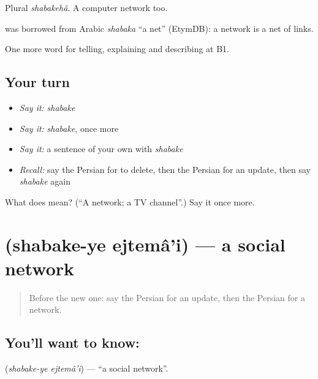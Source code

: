 Plural \emph{shabakehâ}. A computer network too.

\begin{cousinweb}
\textbf{} was borrowed from Arabic \emph{shabaka} \textquotedblleft{}a net\textquotedblright{} (EtymDB): a network is a net of links.
\end{cousinweb}

\begin{grammarlens}[title={What you've built}]
One more word for telling, explaining and describing at B1.
\end{grammarlens}

\subsection*{Your turn}
\begin{itemize}
\raggedright
  \item \emph{Say it:} \emph{shabake}
  \item \emph{Say it:} \emph{shabake}, once more
  \item \emph{Say it:} a sentence of your own with \emph{shabake}
  \item \emph{Recall:} say the Persian for to delete, then the Persian for an update, then say \emph{shabake} again
\end{itemize}

\begin{tcolorbox}[breakable,colback=teal!4,colframe=teal!35!black,title={Before you move on}]
What does  mean? (\textquotedblleft{}A network; a TV channel\textquotedblright{}.) Say it once more.
\end{tcolorbox}
\section[\texorpdfstring{\fa{شبکه} \fa{اجتماعی} (shabake-ye ejtemâ'i)}{شبکه اجتماعی (shabake-ye ejtemâ'i)}]{  (shabake-ye ejtemâ'i) — a social network}

\label{lesson:FA-C417-shabake-ye-ejtemai}



\begin{quote}
Before the new one: say the Persian for an update, then the Persian for a network.
\end{quote}

\subsection*{You'll want to know:  }
\textbf{ } (\emph{shabake-ye ejtemâ'i}) — \textquotedblleft{}a social network\textquotedblright{}.

